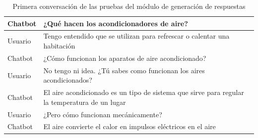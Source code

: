 \begin{table}[h]
{\begin{tabular}{|l|l|}
Chatbot & ¿Qué hacen los acondicionadores de aire?                                 \\ \hline
Usuario & Tengo entendido que se utilizan para refrescar o calentar una habitación \\ \hline
Chatbot & ¿Cómo funcionan los aparatos de aire acondicionado?                      \\ \hline
Usuario & No tengo ni idea. ¿Tú sabes como funcionan los aires acondicionados?     \\ \hline
Chatbot & El aire acondicionado es un tipo de sistema que sirve para regular la temperatura de un lugar \\ \hline
Usuario & ¿Pero cómo funcionan mecánicamente?                                      \\ \hline
Chatbot & El aire convierte el calor en impulsos eléctricos en el aire             \\ \hline
\end{tabular}%
}
\caption{Primera conversación de las pruebas del módulo de generación de respuestas}
\label{tab:pruebas_gen_respu_1}
\end{table}


\begin{table}[h]
\centering
{}
\caption{Segunda conversación de las pruebas del módulo de generación de respuestas}
\label{tab:pruebas_gen_respu_2}
\end{table}


